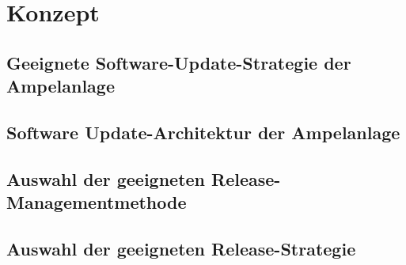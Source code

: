 \section{Konzept}

\subsection{Geeignete Software-Update-Strategie der Ampelanlage}

\subsection{Software Update-Architektur der Ampelanlage}

\subsection{Auswahl der geeigneten Release-Managementmethode}

\subsection{Auswahl der geeigneten Release-Strategie}



